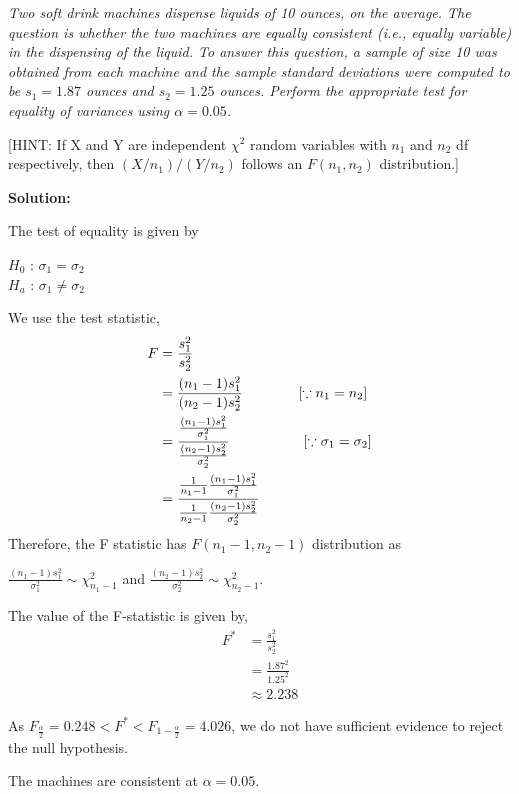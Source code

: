 \documentclass[12pt,letterpaper]{article}
\begin{document}
\textit{Two soft drink machines dispense liquids of 10 ounces, on the average. The question is whether
the two machines are equally consistent (i.e., equally variable) in the dispensing of the liquid.
To answer this question, a sample of size 10 was obtained from each machine and the sample
standard deviations were computed to be $s_1 = 1.87$ ounces and $s_2 = 1.25$ ounces. Perform the
appropriate test for equality of variances using $\alpha = 0.05$.
}

\vspace{1em}

[HINT: If X and Y are independent $\chi^2$ random variables with $n_1$ and $n_2$ df respectively, then
$(X/n_1)/(Y/n_2)$ follows an $F(n_1, n_2)$ distribution.]

\vspace{2em}

\textbf{Solution:}

The test of equality is given by

$H_0$ : $\sigma_1 = \sigma_2$\\
$H_a$ : $\sigma_1 \neq \sigma_2$

We use the test statistic,
\begin{equation}
  \begin{split}
    F &= \frac{s_1^2}{s_2^2}\\
    &= \frac{(n_1 - 1)s_1^2}{(n_2 - 1)s_2^2} \hspace{4em}[\because n_1 = n_2]\\
    &= \frac{\frac{(n_1 - 1)s_1^2}{\sigma_1^2}}{\frac{(n_2 - 1)s_2^2}{\sigma_2^2}} \hspace{5.3em}[\because \sigma_1 = \sigma_2]\\
    &= \frac{\frac{1}{n_1 - 1}\frac{(n_1 - 1)s_1^2}{\sigma_1^2}}{\frac{1}{n_2 - 1}\frac{(n_2 - 1)s_2^2}{\sigma_2^2}}
  \end{split}
\end{equation}
Therefore, the F statistic has $F(n_1 - 1, n_2 - 1)$ distribution as

$\frac{(n_1 - 1)s_1^2}{\sigma_1^2} \sim \chi_{n_1 - 1}^2$ and $\frac{(n_2 - 1)s_2^2}{\sigma_2^2} \sim \chi_{n_2 - 1}^2$.

The value of the F-statistic is given by,
\begin{equation}
  \begin{split}
    F^* &= \frac{s_1^2}{s_2^2}\\
    &= \frac{1.87^2}{1.25^2}\\
    &\approx 2.238
  \end{split}
\end{equation}

As $F_{\frac{\alpha}{2}} = 0.248 < F^* < F_{1 - \frac{\alpha}{2}} = 4.026$,
we do not have sufficient evidence to reject the null hypothesis.

The machines are consistent at $\alpha = 0.05$.
\newpage

\end{document}
